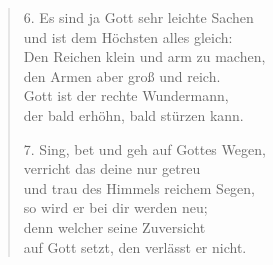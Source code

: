 \documentclass[a4paper,12pt]{article}
\begin{document}
\begin{verse}
6. Es sind ja Gott sehr leichte Sachen\\
und ist dem Höchsten alles gleich:\\
Den Reichen klein und arm zu machen,\\
den Armen aber groß und reich.\\
Gott ist der rechte Wundermann,\\
der bald erhöhn, bald stürzen kann.

7. Sing, bet und geh auf Gottes Wegen,\\
verricht das deine nur getreu\\
und trau des Himmels reichem Segen,\\
so wird er bei dir werden neu;\\
denn welcher seine Zuversicht\\
auf Gott setzt, den verlässt er nicht.
\end{verse}
\end{document}

